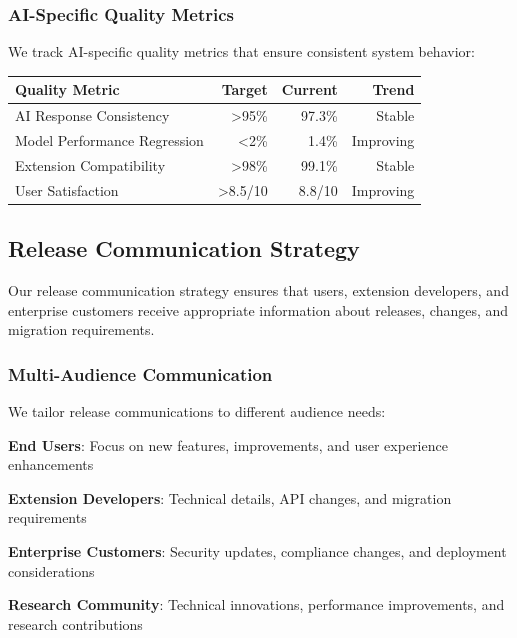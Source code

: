 \subsubsection*{AI-Specific Quality Metrics}

We track AI-specific quality metrics that ensure consistent system behavior:

\begin{center}
\begin{tabular}{@{}lrrr@{}}
\toprule
\textbf{Quality Metric} & \textbf{Target} & \textbf{Current} & \textbf{Trend} \\
\midrule
AI Response Consistency & >95\% & 97.3\% & Stable \\
Model Performance Regression & <2\% & 1.4\% & Improving \\
Extension Compatibility & >98\% & 99.1\% & Stable \\
User Satisfaction & >8.5/10 & 8.8/10 & Improving \\
\bottomrule
\end{tabular}
\end{center}

\subsection*{Release Communication Strategy}

Our release communication strategy ensures that users, extension developers, and enterprise customers receive appropriate information about releases, changes, and migration requirements.

\subsubsection*{Multi-Audience Communication}

We tailor release communications to different audience needs:

\begin{expandedlist}
    \item \textbf{End Users}: Focus on new features, improvements, and user experience enhancements
    \item \textbf{Extension Developers}: Technical details, API changes, and migration requirements
    \item \textbf{Enterprise Customers}: Security updates, compliance changes, and deployment considerations
    \item \textbf{Research Community}: Technical innovations, performance improvements, and research contributions
\end{expandedlist}

